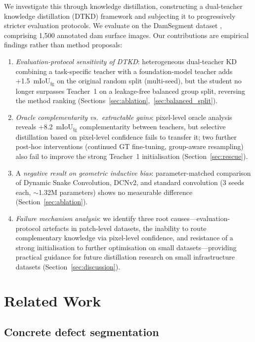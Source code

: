 \documentclass[review,authoryear]{elsarticle}
\begin{document}
We investigate this through knowledge distillation, constructing a dual-teacher knowledge distillation (DTKD) framework and subjecting it to progressively stricter evaluation protocols.
We evaluate on the DamSegment dataset \citep{damsegment2026}, comprising 1{,}500 annotated dam surface images.
Our contributions are empirical findings rather than method proposals:
\begin{enumerate}
    \item \emph{Evaluation-protocol sensitivity of DTKD}: heterogeneous dual-teacher KD combining a task-specific teacher with a foundation-model teacher adds +1.5~mIoU$_{\text{fg}}$ on the original random split (multi-seed), but the student no longer surpasses Teacher~1 on a leakage-free balanced group split, reversing the method ranking (Sections~\ref{sec:ablation},~\ref{sec:balanced_split}).
    \item \emph{Oracle complementarity vs.\ extractable gains}: pixel-level oracle analysis reveals +8.2~mIoU$_{\text{fg}}$ complementarity between teachers, but selective distillation based on pixel-level confidence fails to transfer it; two further post-hoc interventions (continued GT fine-tuning, group-aware resampling) also fail to improve the strong Teacher~1 initialisation (Section~\ref{sec:rescue}).
    \item A \emph{negative result on geometric inductive bias}: parameter-matched comparison of Dynamic Snake Convolution, DCNv2, and standard convolution (3 seeds each, ${\sim}$1.32M parameters) shows no measurable difference (Section~\ref{sec:ablation}).
    \item \emph{Failure mechanism analysis}: we identify three root causes---evaluation-protocol artefacts in patch-level datasets, the inability to route complementary knowledge via pixel-level confidence, and resistance of a strong initialisation to further optimisation on small datasets---providing practical guidance for future distillation research on small infrastructure datasets (Section~\ref{sec:discussion}).
\end{enumerate}

\section{Related Work}
\label{sec:related}

\subsection{Concrete defect segmentation}
\end{document}

